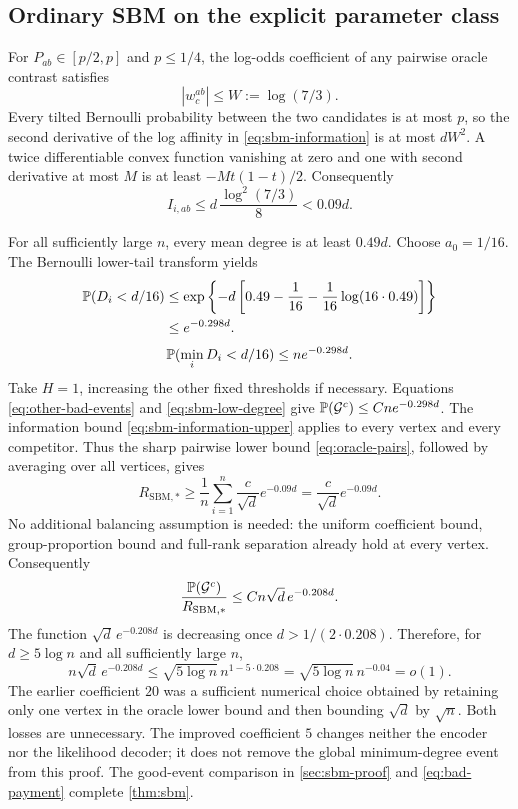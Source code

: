 \subsection{Ordinary SBM on the explicit parameter class}

For $P_{ab}\in[p/2,p]$ and $p\le1/4$, the log-odds coefficient of any
pairwise oracle contrast satisfies
\[
 |w_c^{ab}|\le W:=\log(7/3).
\]
Every tilted Bernoulli probability between the two candidates is at most
$p$, so the second derivative of the log affinity in
\eqref{eq:sbm-information} is at most $dW^2$.
A twice differentiable convex function vanishing at zero and one with
second derivative at most $M$ is at least $-Mt(1-t)/2$.
Consequently
\begin{equation}\label{eq:sbm-information-upper}
 I_{i,ab}\le d\,\frac{\log^2(7/3)}8<0.09d.
\end{equation}

For all sufficiently large $n$, every mean degree is at least $0.49d$.
Choose $a_0=1/16$. The Bernoulli lower-tail transform yields
\begin{align*}
 \mathbb P(D_i<d/16)
 &\le \exp\left\{-d\left[
 0.49-\frac1{16}-\frac1{16}\log(16\cdot0.49)\right]\right\}\\
 &\le e^{-0.298d}.
\end{align*}
\begin{equation}\label{eq:sbm-low-degree}
 \mathbb P(\min_iD_i<d/16)\le ne^{-0.298d}.
\end{equation}
Take $H=1$, increasing the other fixed thresholds if necessary.
Equations \eqref{eq:other-bad-events} and
\eqref{eq:sbm-low-degree} give
$\mathbb P(\mathcal G^c)\le Cne^{-0.298d}$.
The information bound \eqref{eq:sbm-information-upper} applies to every
vertex and every competitor. Thus the sharp pairwise lower bound
\eqref{eq:oracle-pairs}, followed by averaging over all vertices, gives
\[
 R_{\mathrm{SBM},*}\ge
 \frac1n\sum_{i=1}^n\frac c{\sqrt d}e^{-0.09d}
 =\frac c{\sqrt d}e^{-0.09d}.
\]
No additional balancing assumption is needed: the uniform coefficient
bound, group-proportion bound and full-rank separation already hold at
every vertex. Consequently
\[
 \frac{\mathbb P(\mathcal G^c)}{R_{\mathrm{SBM},*}}
 \le Cn\sqrt d\,e^{-0.208d}.
\]
The function $\sqrt d\,e^{-0.208d}$ is decreasing once
$d>1/(2\cdot0.208)$. Therefore, for $d\ge5\log n$ and all sufficiently
large $n$,
\[
 n\sqrt d\,e^{-0.208d}
 \le \sqrt{5\log n}\,n^{1-5\cdot0.208}
 =\sqrt{5\log n}\,n^{-0.04}=o(1).
\]
The earlier coefficient $20$ was a sufficient numerical choice obtained
by retaining only one vertex in the oracle lower bound and then bounding
$\sqrt d$ by $\sqrt n$. Both losses are unnecessary. The improved
coefficient $5$ changes neither the encoder nor the likelihood decoder;
it does not remove the global minimum-degree event from this proof.
The good-event comparison in \cref{sec:sbm-proof} and
\eqref{eq:bad-payment} complete \cref{thm:sbm}.

